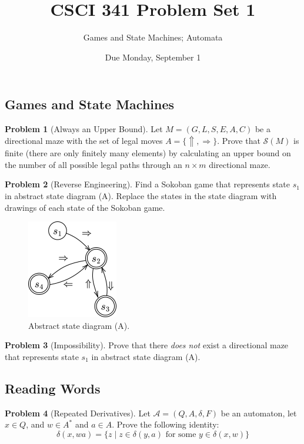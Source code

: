 \documentclass[11pt]{article}
\title{CSCI 341 Problem Set 1}
\author{Games and State Machines; Automata}
\date{Due
    Monday, September 1
}
\theoremstyle{theorem} %
\theoremstyle{definition} %
\newtheorem{problem}                    {{\color{BurntOrange}Problem}}
\theoremstyle{remark} %
\begin{document}
\maketitle

\subsection*{Games and State Machines}

\begin{problem}
    [Always an Upper Bound]
    Let \(M = (G, L, S, E, A, C)\) be a directional maze with the set of legal moves \(A = \{\Uparrow, \Rightarrow\}\).
    Prove that \(\mathcal S(M)\) is finite (there are only finitely many elements) by calculating an upper bound on the number of all possible legal paths through an \(n\times m\) directional maze.
\end{problem}

\begin{problem}
    [Reverse Engineering]
    Find a Sokoban game that represents state \(s_1\) in abstract state diagram (A).
    Replace the states in the state diagram with drawings of each state of the Sokoban game.

    \begin{figure}[h]
        \centering
        \includegraphics{../imgs/reverseengineering.png}
        \caption{Abstract state diagram (A).}
    \end{figure}
\end{problem}

\begin{problem}
    [Impossibility]
    Prove that there \emph{does not} exist a directional maze that represents state \(s_1\) in abstract state diagram (A).
\end{problem}

\subsection*{Reading Words}

\begin{problem}
    [Repeated Derivatives]
    Let \(\mathcal A = (Q, A, \delta, F)\) be an automaton, let \(x \in Q\), and \(w \in A^*\) and \(a \in A\).
    Prove the following identity:
    \[
        \delta(x, w a) = \{z \mid z \in \delta(y, a) \text{ for some } y \in \delta(x, w)\}
    \]
\end{problem}
\end{document}
